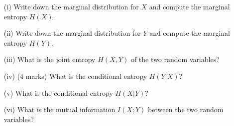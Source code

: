 \documentclass[]{article}
\begin{document}
\begin{itemize}
\begin{itemize}
\item[(i)]  Write down the marginal distribution for $X$ and compute the marginal entropy $H(X)$.
\item[(ii)]  Write down the marginal distribution for $Y$ and compute the marginal entropy $H(Y )$.
\item[(iii)]  What is the joint entropy $H(X, Y ) $ of the two random variables?
\item[(iv)] (4 marks) What is the conditional entropy $H(Y|X)$?
\item[(v)]  What is the conditional entropy $H(X|Y)$?
\item[(vi)]  What is the mutual information $I(X;Y)$ between the two random variables?
\end{itemize}
\end{itemize}
\end{document}
